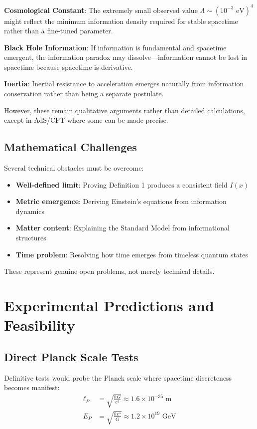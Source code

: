 \documentclass[12pt,twocolumn]{article}
\theoremstyle{definition}
\theoremstyle{remark}
\begin{document}
\textbf{Cosmological Constant}: The extremely small observed value $\Lambda \sim (10^{-3} \text{ eV})^4$ might reflect the minimum information density required for stable spacetime rather than a fine-tuned parameter.

\textbf{Black Hole Information}: If information is fundamental and spacetime emergent, the information paradox may dissolve—information cannot be lost in spacetime because spacetime is derivative.

\textbf{Inertia}: Inertial resistance to acceleration emerges naturally from information conservation rather than being a separate postulate.

However, these remain qualitative arguments rather than detailed calculations, except in AdS/CFT where some can be made precise.

\subsection{Mathematical Challenges}

Several technical obstacles must be overcome:

\begin{itemize}
\item \textbf{Well-defined limit}: Proving Definition 1 produces a consistent field $I(x)$
\item \textbf{Metric emergence}: Deriving Einstein's equations from information dynamics
\item \textbf{Matter content}: Explaining the Standard Model from informational structures
\item \textbf{Time problem}: Resolving how time emerges from timeless quantum states
\end{itemize}

These represent genuine open problems, not merely technical details.

\section{Experimental Predictions and Feasibility}

\subsection{Direct Planck Scale Tests}

Definitive tests would probe the Planck scale where spacetime discreteness becomes manifest:
\begin{align}
\ell_P &= \sqrt{\frac{\hbar G}{c^3}} \approx 1.6 \times 10^{-35} \text{ m} \\
E_P &= \sqrt{\frac{\hbar c^5}{G}} \approx 1.2 \times 10^{19} \text{ GeV}
\end{align}
\end{document}
